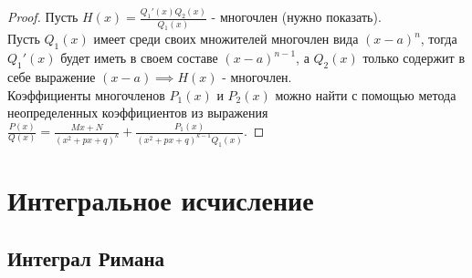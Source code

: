 \documentclass{report}
\theoremstyle{definition}
\begin{document}
\begin{proof}
  Пусть $H(x) = \frac{Q_{1}'(x)Q_{2}(x)}{Q_{1}(x)}$ - многочлен (нужно показать).\\

  Пусть $Q_{1}(x)$ имеет среди своих множителей многочлен вида $(x-a)^{n}$, тогда $Q_{1}'(x)$ будет иметь в своем
  составе $(x-a)^{n-1}$, а $Q_{2}(x)$ только содержит в себе выражение $(x-a) \implies H(x)$ - многочлен.\\

  Коэффициенты многочленов $P_{1}(x)$ и $P_{2}(x)$ можно найти с помощью метода неопределенных коэффициентов
  из выражения $\frac{P(x)}{Q(x)} = \frac{Mx + N}{(x^{2} + px + q)^{k}} + \frac{P_{1}(x)}{(x^{2} + px + q)^{k-1}Q_{1}(x)}$.
\end{proof}

\chapter{Интегральное исчисление}

\section{Интеграл Римана}
\end{document}
